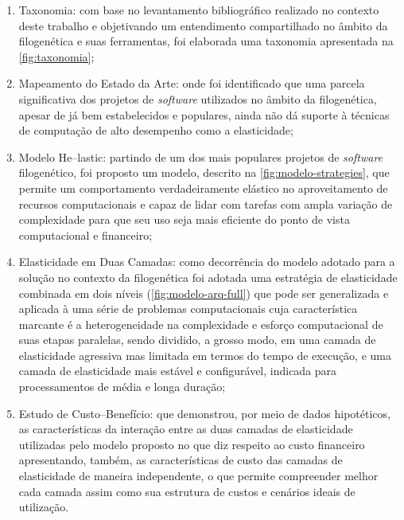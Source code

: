 \documentclass[english,brazilian]{UNISINOSmonografia} %
\begin{document}
\begin{enumerate}[label={\arabic*)}]
	
	\item Taxonomia: com base no levantamento bibliográfico realizado no contexto deste trabalho e objetivando um entendimento compartilhado no âmbito da filogenética e suas ferramentas, foi elaborada uma taxonomia apresentada na \autoref{fig:taxonomia};
	
	
	\item Mapeamento do Estado da Arte: onde foi identificado que uma parcela significativa dos projetos de \textit{software} utilizados no âmbito da filogenética, apesar de já bem estabelecidos e populares, ainda não dá suporte à técnicas de computação de alto desempenho como a elasticidade;
	
	
	\item Modelo \textsf{He}--lastic: partindo de um dos mais populares projetos de \textit{software} filogenético, foi proposto um modelo, descrito na \autoref{fig:modelo-strategies}, que permite um comportamento verdadeiramente elástico no aproveitamento de recursos computacionais e capaz de lidar com tarefas com ampla variação de complexidade para que seu uso seja mais eficiente do ponto de vista computacional e financeiro;
	
	
	\item Elasticidade em Duas Camadas: como decorrência do modelo adotado para a solução no contexto da filogenética foi adotada uma estratégia de elasticidade combinada em dois níveis (\autoref{fig:modelo-arq-full}) que pode ser generalizada e aplicada à uma série de problemas computacionais cuja característica marcante é a heterogeneidade na complexidade e esforço computacional de suas etapas paralelas, sendo dividido, a grosso modo, em uma camada de elasticidade agressiva mas limitada em termos do tempo de execução, e uma camada de elasticidade mais estável e configurável, indicada para processamentos de média e longa duração;
	
	
	\item Estudo de Custo--Benefício: que demonstrou, por meio de dados hipotéticos, as características da interação entre as duas camadas de elasticidade utilizadas pelo modelo proposto no que diz respeito ao custo financeiro apresentando, também, as características de custo das camadas de elasticidade de maneira independente, o que permite compreender melhor cada camada assim como sua estrutura de custos e cenários ideais de utilização.

\end{enumerate}
\end{document}
